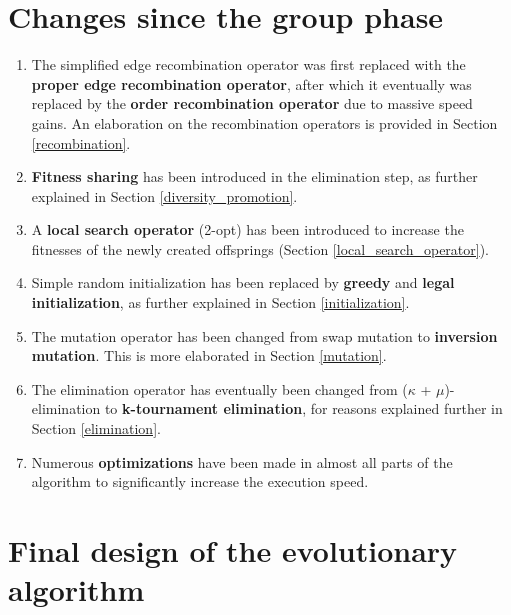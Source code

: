 \documentclass[a4paper,10pt]{article}
\begin{document}
\section{Changes since the group phase} 
\begin{enumerate}
\item The simplified edge recombination operator was first replaced with the \textbf{proper edge recombination operator}, after which it eventually was replaced by the \textbf{order recombination operator} due to massive speed gains. An elaboration on the recombination operators is provided in Section \ref{recombination}. 
\item \textbf{Fitness sharing} has been introduced in the elimination step, as further explained in Section \ref{diversity_promotion}.
\item A \textbf{local search operator} (2-opt) has been introduced to increase the fitnesses of the newly created offsprings (Section \ref{local_search_operator}).
\item Simple random initialization has been replaced by \textbf{greedy} and \textbf{legal initialization}, as further explained in Section \ref{initialization}.
\item The mutation operator has been changed from swap mutation to \textbf{inversion mutation}. This is more elaborated in Section \ref{mutation}.
\item The elimination operator has eventually been changed from ($\kappa$ + $\mu$)-elimination to \textbf{k-tournament elimination}, for reasons explained further in Section \ref{elimination}.
\item Numerous \textbf{optimizations} have been made in almost all parts of the algorithm to significantly increase the execution speed.
\end{enumerate}

\section{Final design of the evolutionary algorithm} 
\end{document}
